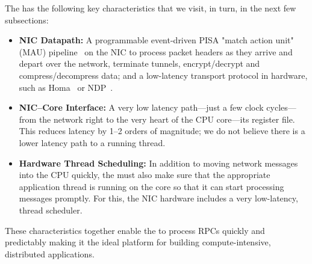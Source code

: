 The \name{} has the following key characteristics that we visit, in turn, in the next few subsections: 
\begin{itemize}
    \item {\bf NIC Datapath:} A programmable event-driven PISA "match action unit" (MAU) pipeline~\cite{event-driven-pisa} on the NIC to process packet headers as they arrive and depart over the network, terminate tunnels, encrypt/decrypt and compress/decompress data; and a low-latency transport protocol in hardware, such as Homa~\cite{homa} or NDP~\cite{ndp}.
    
    \item {\bf NIC--Core Interface:} A very low latency path---just a few clock cycles---from the network right to the very heart of the CPU core---its register file. 
    This reduces latency by 1--2 orders of magnitude; we do not believe there is a lower latency path to a running thread.
    
    \item {\bf Hardware Thread Scheduling:} In addition to moving network messages into the CPU quickly, the \name{} must also make sure that the appropriate application thread is running on the core so that it can start processing messages promptly. For this, the NIC hardware includes a very low-latency, thread scheduler.
\end{itemize}

These characteristics together enable the \name{} to process RPCs quickly and predictably making it the ideal platform for building compute-intensive, distributed applications.







